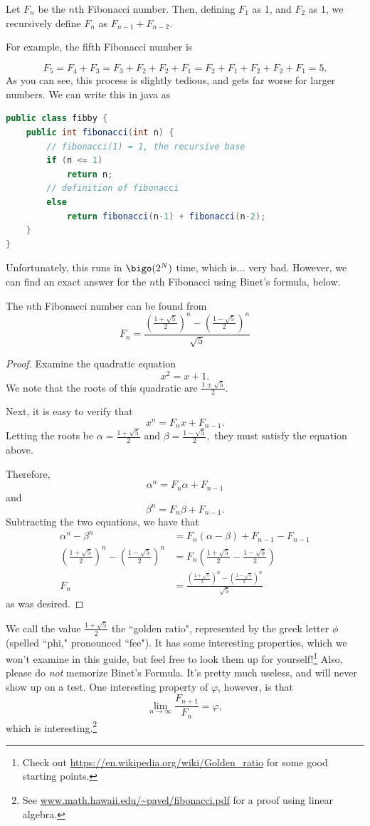 \documentclass[11pt]{article}
\begin{document}
\begin{defn}
	Let $F_n$ be the $n$th Fibonacci number. Then, defining $F_1$ as 1, and $F_2$ as 1, we recursively define $F_n$ as 		$F_{n-1} + F_{n-2}$.
\end{defn}
For example, the fifth Fibonacci number is

\[F_5 = F_4 + F_3 = F_3 + F_2 + F_2 + F_1 = F_2 + F_1 + F_2 + F_2 + F_1 =  5.\]
As you can see, this process is slightly tedious, and gets far worse for larger numbers. We can write this in java as
\begin{lstlisting}[language=Java, caption = fibby.java]
public class fibby {
	public int fibonacci(int n) {
		// fibonacci(1) = 1, the recursive base
		if (n <= 1)
			return n;
		// definition of fibonacci
		else
			return fibonacci(n-1) + fibonacci(n-2);
	}
}\end{lstlisting}

Unfortunately, this runs in $\bigo(2^N)$ time, which is... very bad. However, we can find an exact answer for the $n$th Fibonacci using Binet's formula, below.

\begin{thrm}
	The $n$th Fibonacci number can be found from \[F_n = \frac{\left(\frac{1+\sqrt 5}{2}\right)^n - \left(\frac{1 - \sqrt 5}{2}\right)^n}{\sqrt 5}\]
\end{thrm}

\begin{proof}
Examine the quadratic equation
\[x^2=x+1.\]
We note that the roots of this quadratic are $\frac{1\pm\sqrt{5}}{2}$.

\noindent Next, it is easy to verify that \[x^n=F_nx+F_{n-1}.\] Letting the roots be $\alpha=\frac{1+\sqrt 5}{2}$ and $\beta=\frac{1-\sqrt 5}{2},$ they must satisfy the equation above.

\noindent Therefore,
\[\alpha^n=F_n\alpha+F_{n-1}\] and \[\beta^n=F_n\beta+F_{n-1}.\]
Subtracting the two equations, we have that
\begin{align*}
	\alpha^n-\beta^n &= F_n(\alpha-\beta)+F_{n-1}-F_{n-1} \\
	\left(\frac{1+\sqrt 5}{2}\right)^n - \left(\frac{1-\sqrt 5}{2}\right)^n &= F_n \left(\frac{1+\sqrt 5}{2} - \frac{1-\sqrt 5}{2}\right) \\
	F_n &= \frac{\left(\frac{1+\sqrt 5}{2}\right)^n - \left(\frac{1 - \sqrt 5}{2}\right)^n}{\sqrt 5}
\end{align*}
as was desired.
\end{proof}

\noindent We call the value $\frac{1 + \sqrt{5}}{2}$ the ``golden ratio", represented by the greek letter $\phi$ (spelled ``phi," pronounced ``fee"). It has some interesting properties, which we won't examine in this guide, but feel free to look them up for yourself!\footnote{Check out \url{https://en.wikipedia.org/wiki/Golden_ratio} for some good starting points.} Also, please do \textit{not} memorize Binet's Formula. It's pretty much useless, and will never show up on a test. One interesting property of $\varphi$, however, is that
\[\lim_{n\rightarrow\infty} \frac{F_{n+1}}{F_n} = \varphi,\]
which is interesting.\footnote{See \url{www.math.hawaii.edu/~pavel/fibonacci.pdf} for a proof using linear algebra.}
\end{document}
